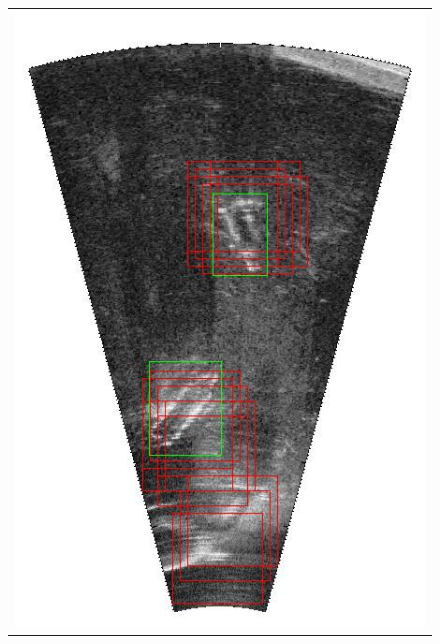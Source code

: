 \begin{figure}[p]
{\begin{tabular}[b]{c}
		\includegraphics[height=0.22\textheight]{chapters/images/proposals/detections/fcn-nms070-2016-02-11_035335-frame11602-proposals.jpg}\\        

\end{tabular}}
\end{figure}
